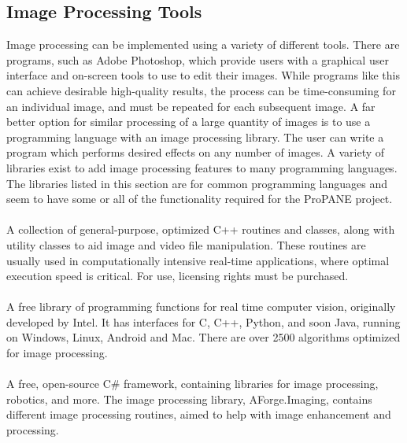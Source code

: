 \documentclass[]{article}
\begin{document}
\subsection{Image Processing Tools}

\noindent Image processing can be implemented using a variety of different tools.  There are programs, such as Adobe Photoshop, which provide users with a graphical user interface and on-screen tools to use to edit their images.  While programs like this can achieve desirable high-quality results, the process can be time-consuming for an individual image, and must be repeated for each subsequent image.  A far better option for similar processing of a large quantity of images is to use a programming language with an image processing library.  The user can write a program which performs desired effects on any number of images.  A variety of libraries exist to add image processing features to many programming languages.  The libraries listed in this section are for common programming languages and seem to have some or all of the functionality required for the ProPANE project.  \\ 

 \cite{eutecus} \\

\noindent A collection of general-purpose, optimized C++ routines and classes, along with utility classes to aid image and video file manipulation.  These routines are usually used in computationally intensive real-time applications, where optimal execution speed is critical.  For use, licensing rights must be purchased. \\

 \cite{opencv} \\

\noindent A free library of programming functions for real time computer vision, originally developed by Intel.  It has interfaces for C, C++, Python, and soon Java, running on Windows, Linux, Android and Mac.  There are over 2500 algorithms optimized for image processing.  \\

 \cite{aforge1} \\

\noindent A free, open-source C\# framework, containing libraries for image processing, robotics, and more.  The image processing library, AForge.Imaging, contains different image processing routines, aimed to help with image enhancement and processing.  \\
\end{document}
